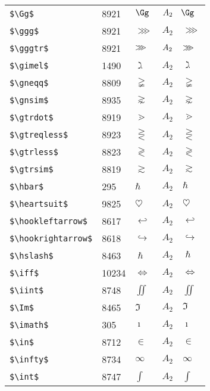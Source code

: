 \documentclass{article}
\begin{document}
\begin{table}
\begin{center}
\begin{tabular}{llll}
 \verb#$\Gg$#                 & 8921 & $\Gg$                 & $A_2\quad \Gg$\\
 \verb#$\ggg$#                & 8921 & $\ggg$                & $A_2\quad \ggg$\\
 \verb#$\gggtr$#              & 8921 & $\gggtr$              & $A_2\quad \gggtr$\\
 \verb#$\gimel$#              & 1490 & $\gimel$              & $A_2\quad \gimel$\\
 \verb#$\gneqq$#              & 8809 & $\gneqq$              & $A_2\quad \gneqq$\\
 \verb#$\gnsim$#              & 8935 & $\gnsim$              & $A_2\quad \gnsim$\\
 \verb#$\gtrdot$#             & 8919 & $\gtrdot$             & $A_2\quad \gtrdot$\\
 \verb#$\gtreqless$#          & 8923 & $\gtreqless$          & $A_2\quad \gtreqless$\\
 \verb#$\gtrless$#            & 8823 & $\gtrless$            & $A_2\quad \gtrless$\\
 \verb#$\gtrsim$#             & 8819 & $\gtrsim$             & $A_2\quad \gtrsim$\\
 \verb#$\hbar$#                & 295 & $\hbar$               & $A_2\quad \hbar$\\
 \verb#$\heartsuit$#          & 9825 & $\heartsuit$          & $A_2\quad \heartsuit$\\
 \verb#$\hookleftarrow$#      & 8617 & $\hookleftarrow$      & $A_2\quad \hookleftarrow$\\
 \verb#$\hookrightarrow$#     & 8618 & $\hookrightarrow$     & $A_2\quad \hookrightarrow$\\
 \verb#$\hslash$#             & 8463 & $\hslash$             & $A_2\quad \hslash$\\
 \verb#$\iff$#               & 10234 & $\iff$                & $A_2\quad \iff$\\
 \verb#$\iint$#               & 8748 & $\iint$               & $A_2\quad \iint$\\
 \verb#$\Im$#                 & 8465 & $\Im$                 & $A_2\quad \Im$\\
 \verb#$\imath$#               & 305 & $\imath$              & $A_2\quad \imath$\\
 \verb#$\in$#                 & 8712 & $\in$                 & $A_2\quad \in$\\
 \verb#$\infty$#              & 8734 & $\infty$              & $A_2\quad \infty$\\
 \verb#$\int$#                & 8747 & $\int$                & $A_2\quad \int$\\

\end{tabular}
\end{center}
\end{table}
\end{document}
